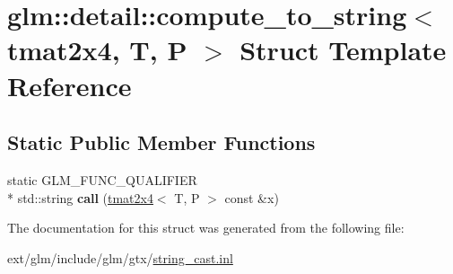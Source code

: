 \hypertarget{structglm_1_1detail_1_1compute__to__string_3_01tmat2x4_00_01_t_00_01_p_01_4}{\section{glm\-:\-:detail\-:\-:compute\-\_\-to\-\_\-string$<$ tmat2x4, T, P $>$ Struct Template Reference}
\label{structglm_1_1detail_1_1compute__to__string_3_01tmat2x4_00_01_t_00_01_p_01_4}
}
\subsection*{Static Public Member Functions}
\begin{DoxyCompactItemize}
\item 
\hypertarget{structglm_1_1detail_1_1compute__to__string_3_01tmat2x4_00_01_t_00_01_p_01_4_a4db0bd22adda3c7b7cb7e697aefe0a76}{static G\-L\-M\-\_\-\-F\-U\-N\-C\-\_\-\-Q\-U\-A\-L\-I\-F\-I\-E\-R \\*
std\-::string {\bfseries call} (\hyperlink{structglm_1_1tmat2x4}{tmat2x4}$<$ T, P $>$ const \&x)}\label{structglm_1_1detail_1_1compute__to__string_3_01tmat2x4_00_01_t_00_01_p_01_4_a4db0bd22adda3c7b7cb7e697aefe0a76}

\end{DoxyCompactItemize}


The documentation for this struct was generated from the following file\-:\begin{DoxyCompactItemize}
\item 
ext/glm/include/glm/gtx/\hyperlink{string__cast_8inl}{string\-\_\-cast.\-inl}\end{DoxyCompactItemize}
